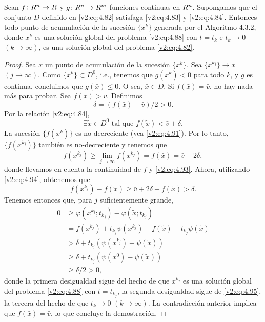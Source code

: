 \begin{theorem}\label{v2:thm:4.3.7}
    Sean $f \colon R^n \to R$ y $g \colon R^n \to R^m$ funciones continuas en $R^n$. Supongamos que el conjunto $D$ definido en \eqref{v2:eq:4.82} satisfaga \eqref{v2:eq:4.83} y \eqref{v2:eq:4.84}.
    Entonces todo punto de acumulación de la sucesión $\{x^k\}$ generada por el Algoritmo 4.3.2, donde $x^k$ es una solución global del problema \eqref{v2:eq:4.88} con $t = t_k$ e $t_k \to 0$ $(k \to \infty)$, es una solución global del problema \eqref{v2:eq:4.82}.
\end{theorem}
\begin{proof}
    Sea $\bar{x}$ un punto de acumulación de la sucesión $\{x^k\}$. Sea $\{x^{k_j}\} \to \bar{x}$ $(j \to \infty)$. Como $\{x^k\} \subset D^0$, i.e., tenemos que $g(x^k) < 0$ para todo $k$, y $g$ es continua, concluimos que $g(\bar{x}) \le 0$. O sea, $\bar{x} \in D$.
    Si $f(\bar{x}) = \bar{v}$, no hay nada más para probar. Sea $f(\bar{x}) > \bar{v}$. Definimos
    \begin{equation}
        \delta = (f(\bar{x}) - \bar{v})/2 > 0.
        \label{v2:eq:4.93}
    \end{equation}
    Por la relación \eqref{v2:eq:4.84},
    \begin{equation}
        \exists \tilde{x} \in D^0 \text{ tal que } f(\tilde{x}) < \bar{v} + \delta.
        \label{v2:eq:4.94}
    \end{equation}
    La sucesión $\{f(x^k)\}$ es no-decreciente (vea \eqref{v2:eq:4.91}). Por lo tanto, $\{f(x^{k_j})\}$ también es no-decreciente y tenemos que
    \[
        f(x^{k_j}) \ge \lim_{j \to \infty} f(x^{k_j}) = f(\bar{x}) = \bar{v} + 2\delta,
    \]
    donde llevamos en cuenta la continuidad de $f$ y \eqref{v2:eq:4.93}.
    Ahora, utilizando \eqref{v2:eq:4.94}, obtenemos que
    \begin{equation}
        f(x^{k_j}) - f(\tilde{x}) \ge \bar{v} + 2\delta - f(\tilde{x}) > \delta.
        \label{v2:eq:4.95}
    \end{equation}
    Tenemos entonces que, para $j$ suficientemente grande,
    \begin{align*}
        0 &\ge \varphi(x^{k_j}; t_{k_j}) - \varphi(\tilde{x}; t_{k_j}) \\
        &= f(x^{k_j}) + t_{k_j}\psi(x^{k_j}) - f(\tilde{x}) - t_{k_j}\psi(\tilde{x}) \\
        &> \delta + t_{k_j}(\psi(x^{k_j}) - \psi(\tilde{x})) \\
        &\ge \delta + t_{k_j}(\psi(x^0) - \psi(\tilde{x})) \\
        &\ge \delta/2 > 0,
    \end{align*}
    donde la primera desigualdad sigue del hecho de que $x^{k_j}$ es una solución global del problema \eqref{v2:eq:4.88} con $t = t_{k_j}$, la segunda desigualdad sigue de \eqref{v2:eq:4.95}, la tercera del hecho de que $t_k \to 0$ $(k \to \infty)$.
    La contradicción anterior implica que $f(\bar{x}) = \bar{v}$, lo que concluye la demostración.
\end{proof}

